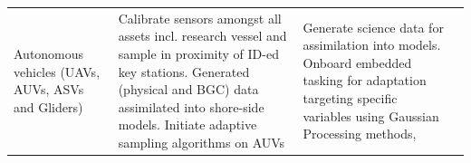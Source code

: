 \begin{table}[!t]
{\begin{tabular}{|p{4cm}|p{4cm}|p{4cm}|p{4cm}|}
   Autonomous vehicles (UAVs, AUVs, ASVs and Gliders)&Calibrate sensors
                                                        amongst all
                                                        assets incl.
                                                        research vessel
                                                        and sample in
                                                        proximity of
                                                        ID-ed key
                                                        stations.
                                                        Generated
                                                        (physical and
                                                        BGC) data
                                                        assimilated into
                                                        shore-side
                                                        models. Initiate
                                  adaptive sampling algorithms on
                                                        AUVs&Generate
                                                              science
                                                              data for
                                                              assimilation
                                                              into
                                                              models.
                                                              Onboard
                                                              embedded
                                                              tasking
                                                              for
                                                              adaptation
                                                              targeting
                                                              specific
                                                              variables
                                                              using
                                                              Gaussian
                                                              Processing
                                                              methods\cite{fossum19,fossum21},

\end{tabular}}
\end{table}
